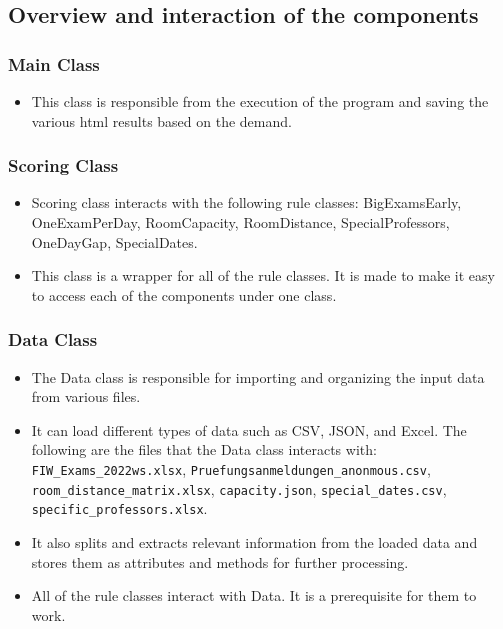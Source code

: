 \subsection{Overview and interaction of the components}

\subsubsection{Main Class}


\begin{itemize}
\item This class is responsible from the execution of the program and saving the various html results based on the demand.
\end{itemize}




\subsubsection{Scoring Class}


\begin{itemize}
\item Scoring class interacts with the following rule classes: BigExamsEarly, OneExamPerDay, RoomCapacity, RoomDistance, SpecialProfessors, OneDayGap, SpecialDates.
\item This class is a wrapper for all of the rule classes. It is made to make it easy to access each of the components under one class.
\end{itemize}


\subsubsection{Data Class}


\begin{itemize}
\item The Data class is responsible for importing and organizing the input data from various files.
\item It can load different types of data such as CSV, JSON, and Excel. The following are the files that the Data class interacts with: \texttt{FIW\_Exams\_2022ws.xlsx}, \texttt{Pruefungsanmeldungen\_anonmous.csv}, \texttt{room\_distance\_matrix.xlsx}, \texttt{capacity.json}, \texttt{special\_dates.csv}, \texttt{specific\_professors.xlsx}.
\item It also splits and extracts relevant information from the loaded data and stores them as attributes and methods for further processing.
\item All of the rule classes interact with Data. It is a prerequisite for them to work.
\end{itemize}


